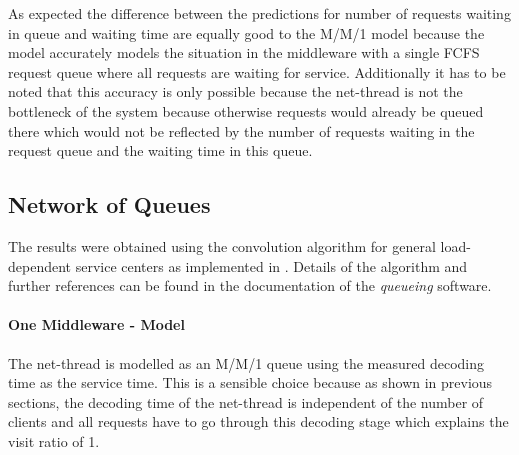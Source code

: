 \documentclass[report.tex]{subfiles}
\begin{document}
As expected the difference between the predictions for number of requests waiting in queue and waiting time are equally good to the M/M/1 model because the model accurately models the situation in the middleware with a single FCFS request queue where all requests are waiting for service. Additionally it has to be noted that this accuracy is only possible because the net-thread is not the bottleneck of the system because otherwise requests would already be queued there which would not be reflected by the number of requests waiting in the request queue and the waiting time in this queue.


\subsection{Network of Queues}


The results were obtained using the convolution algorithm for general load-dependent service centers as implemented in \cite{queueing}.
Details of the algorithm and further references can be found in the documentation of the \emph{queueing} software.


\paragraph{One Middleware - Model}

The net-thread is modelled as an M/M/1 queue using the measured decoding time as the service time.
This is a sensible choice because as shown in previous sections, the decoding time of the net-thread is independent of the number of clients and all requests have to go through this decoding stage which explains the visit ratio of 1.
\end{document}
